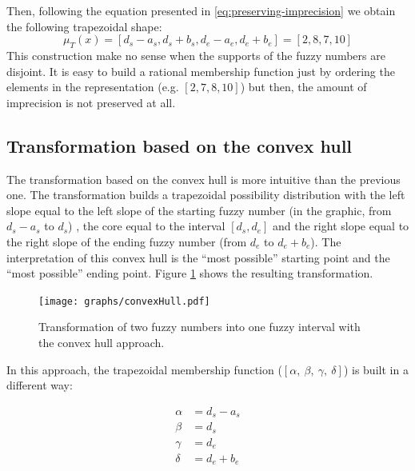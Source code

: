 \documentclass[twoside,twocolumn,a4paper]{article}
\begin{document}
Then, following the equation presented in \eqref{eq:preserving-imprecision} we obtain the following trapezoidal shape:
\begin{equation}
\mu_{T}\left(x\right) = [d_s-a_s,d_s+b_s,d_e-a_e,d_e+b_e] = [2,8,7,10]
\end{equation}
This construction make no sense when the supports of the fuzzy numbers are disjoint. It is easy to build a rational membership function just by ordering the elements in the representation (e.g. $[2,7,8,10]$) but then, the amount of imprecision is not preserved at all. 


\subsection{\label{subsubsec:trans-convex-hull}Transformation based on the convex hull}
The transformation based on the convex hull is more intuitive than the previous one. The transformation builds a trapezoidal possibility distribution with the left slope equal to the left slope of the starting fuzzy number (in the graphic, from $d_s-a_s$ to $d_s$) , the core equal to the interval $[d_s,d_e]$ and the right slope equal to the right slope of the ending fuzzy number (from $d_e$ to $d_e+b_e$). The interpretation of this convex hull is the ``most possible'' starting point and the ``most possible'' ending point. Figure \ref{fig:convexHull} shows the resulting transformation.
\begin{figure}[h!]
  \centering
  \texttt{[image: graphs/convexHull.pdf]}
  \caption{Transformation of two fuzzy numbers into one fuzzy interval with the convex hull approach.}
  \label{fig:convexHull}
\end{figure}

In this approach, the trapezoidal membership function ($\left[\alpha,\ \beta,\ \gamma,\ \delta\right]$) is built in a different way:

\begin{align}
\nonumber
\alpha & =  d_s - a_s \\
\nonumber
\beta & = d_s \\
\nonumber
\gamma &= d_e  \\
\nonumber
\delta &= d_e + b_e 
\end{align}
\end{document}
